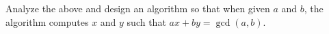 Analyze the above and design an algorithm 
so that when given $a$ and $b$, the algorithm computes
$x$ and $y$ such that $ax + by = \gcd(a,b)$.
